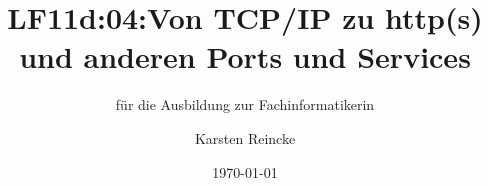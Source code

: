 \documentclass[]{beamer}
\title{LF11d:04:Von TCP/IP zu http(s) und anderen Ports und Services}
\subtitle{für die Ausbildung zur Fachinformatikerin}
\institute{GS-LDK}
\author{Karsten Reincke}
\date{\today}
\def\cfgGl{../../../cfg.gl/}
\begin{document}

\begin{frame}
  \titlepage

  
\end{frame}






\logo{}
\newpage



%
\end{document}
